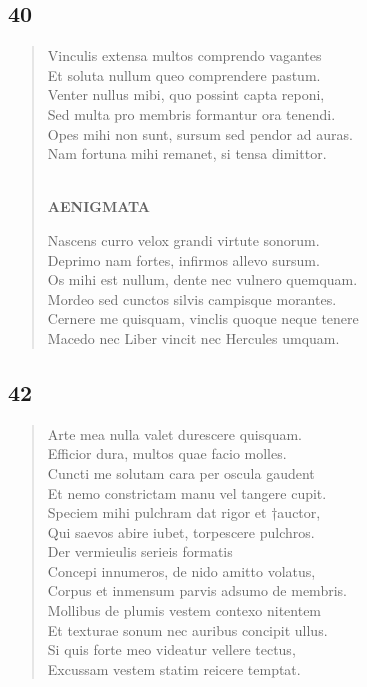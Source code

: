 \documentclass[11pt, a4paper]{report}
\begin{document}
            \subsection*{40}
      \begin{verse}
      Vinculis extensa multos comprendo vagantes \\ Et soluta nullum queo comprendere pastum. \\ Venter nullus mibi, quo possint capta reponi, \\ Sed multa pro membris formantur ora tenendi. \\ Opes mihi non sunt, sursum sed pendor ad auras. \\ Nam fortuna mihi remanet, si tensa dimittor. \\ 
        ﻿\pagebreak 
    \begin{center} \textbf{AENIGMATA} \end{center} \marginpar{[364]} Nascens curro velox grandi virtute sonorum. \\ Deprimo nam fortes, infirmos allevo sursum. \\ Os mihi est nullum, dente nec vulnero quemquam. \\ Mordeo sed cunctos silvis campisque morantes. \\ Cernere me quisquam, vinclis quoque neque tenere \\ Macedo nec Liber vincit nec Hercules umquam. \\ 
      \end{verse}
  
            \subsection*{42}
      \begin{verse}
      Arte mea nulla valet durescere quisquam. \\ Efficior dura, multos quae facio molles. \\ Cuncti me solutam cara per oscula gaudent \\ Et nemo constrictam manu vel tangere cupit. \\ Speciem mihi pulchram dat rigor et †auctor, \\ Qui saevos abire iubet, torpescere pulchros. \\ Der vermieulis serieis formatis \\ Concepi innumeros, de nido amitto volatus, \\ Corpus et inmensum parvis adsumo de membris. \\ Mollibus de plumis vestem contexo nitentem \\ Et texturae sonum nec auribus concipit ullus. \\ Si quis forte meo videatur vellere tectus, \\ Excussam vestem statim reicere temptat. \\ 
      \end{verse}
  
\end{document}
